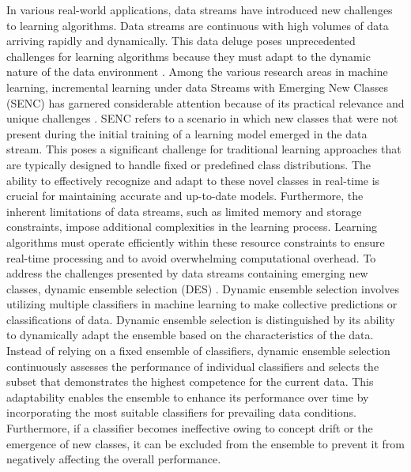   In various real-world applications, data streams have introduced new challenges to learning algorithms. Data streams are continuous with high volumes of data arriving rapidly and dynamically. This data deluge poses unprecedented challenges for learning algorithms because they must adapt to the dynamic nature of the data environment \cite{yang2021concept}\cite{dong2019multistream}\cite{shan2018online}. Among the various research areas in machine learning, incremental learning under data Streams with Emerging New Classes (SENC) has garnered considerable attention because of its practical relevance and unique challenges \cite{da2014learning}\cite{mu2017streaming}\cite{zhu2020semi}. SENC refers to a scenario in which new classes that were not present during the initial training of a learning model emerged in the data stream. This poses a significant challenge for traditional learning approaches that are typically designed to handle fixed or predefined class distributions. The ability to effectively recognize and adapt to these novel classes in real-time is crucial for maintaining accurate and up-to-date models. Furthermore, the inherent limitations of data streams, such as limited memory and storage constraints, impose additional complexities in the learning process. Learning algorithms must operate efficiently within these resource constraints to ensure real-time processing and to avoid overwhelming computational overhead.
  To address the challenges presented by data streams containing emerging new classes, dynamic ensemble selection (DES) \cite{cruz2017meta}\cite{jackowski2014improved}\cite{kuncheva2000clustering}. Dynamic ensemble selection involves utilizing multiple classifiers in machine learning to make collective predictions or classifications of data. Dynamic ensemble selection is distinguished by its ability to dynamically adapt the ensemble based on the characteristics of the data. Instead of relying on a fixed ensemble of classifiers, dynamic ensemble selection continuously assesses the performance of individual classifiers and selects the subset that demonstrates the highest competence for the current data. This adaptability enables the ensemble to enhance its performance over time by incorporating the most suitable classifiers for prevailing data conditions. Furthermore, if a classifier becomes ineffective owing to concept drift or the emergence of new classes, it can be excluded from the ensemble to prevent it from negatively affecting the overall performance.
